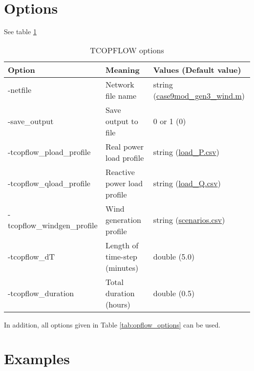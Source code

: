 \section{Options}
See table \ref{tab:tcopflow_options}
\begin{table}[!htbp]
  \caption{TCOPFLOW options}
  \small
  \begin{tabular}{|p{}|p{}|p{}|}
    \hline
    \textbf{Option} & \textbf{Meaning} & \textbf{Values (Default value)} \\ \hline
    -netfile & Network file name & string (\href{https://gitlab.pnnl.gov/exasgd/frameworks/exago/-/blob/master/datafiles/case9/case9mod_gen3_wind.m}{case9mod_gen3_wind.m}) \\ \hline
    -save\_output & Save output to file & 0 or 1 (0) \\ \hline
    -tcopflow\_pload\_profile & Real power load profile & string (\href{https://gitlab.pnnl.gov/exasgd/frameworks/exago/-/blob/master/datafiles/case9/load_P.csv}{load_P.csv}) \\ \hline
    -tcopflow\_qload\_profile & Reactive power load profile & string (\href{https://gitlab.pnnl.gov/exasgd/frameworks/exago/-/blob/master/datafiles/case9/load_Q.csv}{load_Q.csv}) \\ \hline
    -tcopflow\_windgen\_profile & Wind generation profile & string (\href{https://gitlab.pnnl.gov/exasgd/frameworks/exago/-/blob/master/datafiles/case9/scenarios.csv}{scenarios.csv}) \\ \hline
    -tcopflow\_dT & Length of time-step (minutes) & double (5.0) \\ \hline
    -tcopflow\_duration & Total duration (hours) & double (0.5) \\ \hline 
  \end{tabular}
  \label{tab:tcopflow_options}
\end{table}
In addition, all \opflow options given in Table \ref{tab:opflow_options} can be used.
\section{Examples}
\todo
